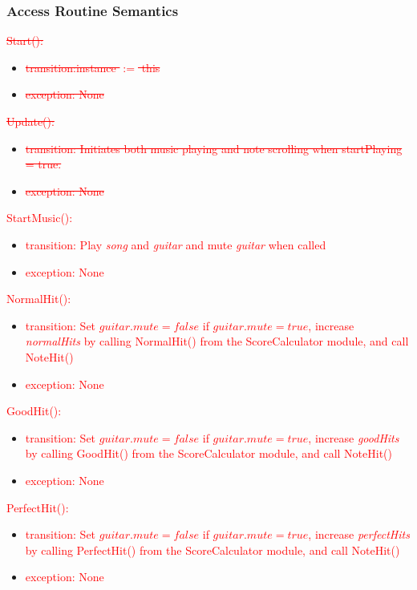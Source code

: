\documentclass[12pt]{article}
\begin{document}
\subsubsection{Access Routine Semantics}
\noindent \textcolor{red}{\sout{Start():}}
\begin{itemize}
	\item \textcolor{red}{\sout{transition:instance $:=$ this}}
	\item \textcolor{red}{\sout{exception: None}}
\end{itemize}
\noindent \textcolor{red}{\sout{Update():}}
\begin{itemize}
	\item \textcolor{red}{\sout{transition: Initiates both music playing and note scrolling when startPlaying = true.}}
	\item \textcolor{red}{\sout{exception: None}}
\end{itemize}

\noindent \textcolor{red}{StartMusic():}
\begin{itemize}
    \item \textcolor{red}{transition: Play \textit{song} and \textit{guitar} and mute \textit{guitar} when called}
    \item \textcolor{red}{exception: None}
\end{itemize}

\noindent \textcolor{red}{NormalHit():}
\begin{itemize}
    \item \textcolor{red}{transition: Set $guitar.mute = false$ if $guitar.mute = true$, increase \textit{normalHits} by calling NormalHit() from the ScoreCalculator module, and call NoteHit()}
    \item \textcolor{red}{exception: None}
\end{itemize}

\noindent \textcolor{red}{GoodHit():}
\begin{itemize}
    \item \textcolor{red}{transition: Set $guitar.mute = false$ if $guitar.mute = true$, increase \textit{goodHits} by calling GoodHit() from the ScoreCalculator module, and call NoteHit()}
    \item \textcolor{red}{exception: None}
\end{itemize}

\noindent \textcolor{red}{PerfectHit():}
\begin{itemize}
    \item \textcolor{red}{transition: Set $guitar.mute = false$ if $guitar.mute = true$, increase \textit{perfectHits} by calling PerfectHit() from the ScoreCalculator module, and call NoteHit()}
    \item \textcolor{red}{exception: None}
\end{itemize}
\end{document}

